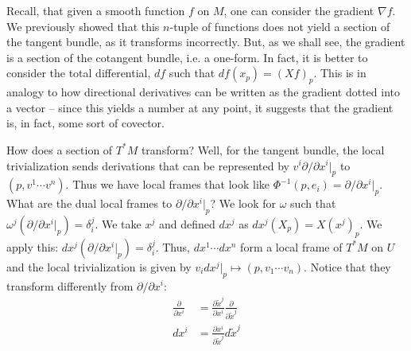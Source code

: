 \documentclass{../mathnotes}
\begin{document}
\begin{exmp}
    Recall, that given a smooth function $f$ on $M$, one can consider the gradient $\nabla f$. We previously showed that this $n$-tuple 
    of functions does not yield a section of the tangent bundle, as it transforms incorrectly. But, as we shall see,
    the gradient is a section of the cotangent bundle, i.e. a one-form. In fact, it is better to consider the total differential,
    $df$ such that $df(x_p)=(Xf)_p$. This is in analogy to how directional derivatives can be written as the gradient dotted into a vector -- 
    since this yields a number at any point, it suggests that the gradient is, in fact, some sort of covector.
\end{exmp}

How does a section of $T^*M$ transform? Well, for the tangent bundle, the local trivialization sends derivations that can
be represented by $v^i\partial/\partial x^i|_p$ to $(p,v^1\cdots v^n)$. Thus we have local frames that look like
$\Phi^{-1}(p,e_i)=\partial/\partial x^i|_p$. What are the dual local frames to $\partial/\partial x^i|_p$? We look for
$\omega$ such that $\omega^j(\partial/\partial x^i|_p)=\delta^j_i$. We take $x^j$ and defined $dx^j$ as
$dx^j(X_p)=X(x^j)_p$. We apply this: $dx^j(\partial/\partial x^i|_p)=\delta_i^j$. Thus, $dx^1\cdots dx^n$ form a local
frame of $T^*M$ on $U$ and the local trivialization is given by $v_idx^j|_p\mapsto (p,v_1\cdots v_n)$. Notice that they transform
differently from $\partial/\partial x^i$:
\begin{align*}
    \frac{\partial}{\partial x^i}&=\frac{\partial \tilde{x}^j}{\partial x^i}\frac{\partial}{\partial \tilde{x}^j}\\
    dx^i&=\frac{\partial x^i}{\partial \tilde{x}^j}d\tilde{x}^j
\end{align*}
\end{document}
